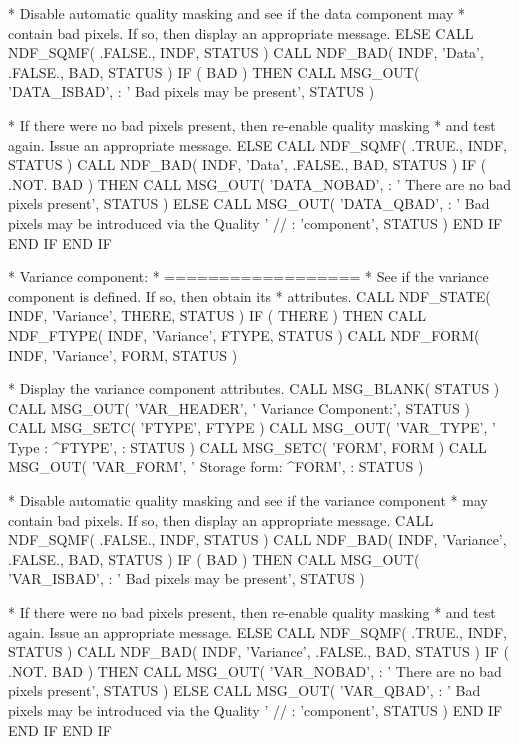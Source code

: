 \documentclass[twoside,11pt,nolof]{starlink}
\begin{document}
\begin{terminalv}
*  Disable automatic quality masking and see if the data component may
*  contain bad pixels. If so, then display an appropriate message.
      ELSE
         CALL NDF_SQMF( .FALSE., INDF, STATUS )
         CALL NDF_BAD( INDF, 'Data', .FALSE., BAD, STATUS )
         IF ( BAD ) THEN
            CALL MSG_OUT( 'DATA_ISBAD',
     :      '      Bad pixels may be present', STATUS )

*  If there were no bad pixels present, then re-enable quality masking
*  and test again. Issue an appropriate message.
         ELSE
            CALL NDF_SQMF( .TRUE., INDF, STATUS )
            CALL NDF_BAD( INDF, 'Data', .FALSE., BAD, STATUS )
            IF ( .NOT. BAD ) THEN
               CALL MSG_OUT( 'DATA_NOBAD',
     :         '      There are no bad pixels present', STATUS )
            ELSE
               CALL MSG_OUT( 'DATA_QBAD',
     :         '      Bad pixels may be introduced via the Quality ' //
     :         'component', STATUS )
            END IF
         END IF
      END IF

*  Variance component:
*  ==================
*  See if the variance component is defined.  If so, then obtain its
*  attributes.
      CALL NDF_STATE( INDF, 'Variance', THERE, STATUS )
      IF ( THERE ) THEN
         CALL NDF_FTYPE( INDF, 'Variance', FTYPE, STATUS )
         CALL NDF_FORM( INDF, 'Variance', FORM, STATUS )

*  Display the variance component attributes.
         CALL MSG_BLANK( STATUS )
         CALL MSG_OUT( 'VAR_HEADER', '   Variance Component:', STATUS )
         CALL MSG_SETC( 'FTYPE', FTYPE )
         CALL MSG_OUT( 'VAR_TYPE', '      Type        :  ^FTYPE',
     :                 STATUS )
         CALL MSG_SETC( 'FORM', FORM )
         CALL MSG_OUT( 'VAR_FORM', '      Storage form:  ^FORM',
     :                 STATUS )

*  Disable automatic quality masking and see if the variance component
*  may contain bad pixels. If so, then display an appropriate message.
         CALL NDF_SQMF( .FALSE., INDF, STATUS )
         CALL NDF_BAD( INDF, 'Variance', .FALSE., BAD, STATUS )
         IF ( BAD ) THEN
            CALL MSG_OUT( 'VAR_ISBAD',
     :      '      Bad pixels may be present', STATUS )

*  If there were no bad pixels present, then re-enable quality masking
*  and test again. Issue an appropriate message.
         ELSE
            CALL NDF_SQMF( .TRUE., INDF, STATUS )
            CALL NDF_BAD( INDF, 'Variance', .FALSE., BAD, STATUS )
            IF ( .NOT. BAD ) THEN
               CALL MSG_OUT( 'VAR_NOBAD',
     :         '      There are no bad pixels present', STATUS )
            ELSE
               CALL MSG_OUT( 'VAR_QBAD',
     :         '      Bad pixels may be introduced via the Quality ' //
     :         'component', STATUS )
            END IF
         END IF
      END IF


\end{terminalv}
\end{document}
